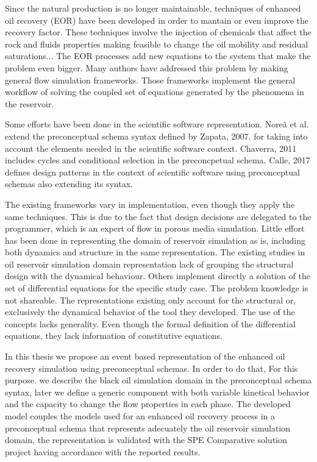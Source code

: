 Since the natural production is no longer maintainable, techniques of enhanced oil recovery (EOR) have been developed in order to mantain or even improve the recovery factor. These techniques involve the injection of chemicals that affect the rock and fluids properties making feasible to change the oil mobility and residual saturations... The EOR processes add new equations to the system that make the problem even bigger. Many authors have addressed this problem by making general flow simulation frameworks. Those frameworks implement the general workflow of solving the coupled set of equations generated by the phenomena in the reservoir.

Some efforts have been done in the scientific software representation. Nore\~{a} et al. extend the preconceptual schema syntax defined by Zapata, 2007. for taking into account the elements needed in the scientific software context. Chaverra, 2011 includes cycles and conditional selection in the preconcpetual schema. Calle, 2017 defines design patterns in the context of scientific software using preconceptual schemas also extending its syntax.


The existing frameworks vary in implementation, even though they apply the same techniques. This is due to the fact that design decisions are delegated to the programmer, which is an expert of flow in porous media simulation. Little effort has been done in representing the domain of reservoir simulation as is, including both dynamics and structure in the same representation. The existing studies in oil reservoir simulation domain representation lack of grouping the structural design with the dynamical behaviour. Others implement directly a solution of the set of differential equations for the specific study case. The problem knowledge is not shareable. The representations existing only account for the structural or, exclusively the dynamical behavior of the tool they developed. The use of the concepts lacks generality. Even though the formal definition of the differential equations, they lack information of constitutive equations. 

In this thesis we propose an event based representation of the enhanced oil recovery simulation using preconceptual schemas. In order to do that, For this purpose. we describe the black oil simulation domain in the preconceptual schema syntax, later we define a generic component with both variable kinetical behavior and the capacity to change the flow properties in each phase. The developed model couples the models used for an enhanced oil recovery process in a preconceptual schema that represents adecuately the oil reservoir simulation domain, the representation is validated with the SPE Comparative solution project having accordance with the reported results.
